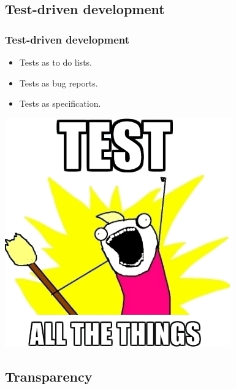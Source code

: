 \documentclass[12pt,compress,english,utf8,t]{beamer}
\begin{document}

\subsection{Test-driven development}

\begin{frame}\frametitle{Test-driven development}
  \begin{itemize}
    \item Tests as to do lists.
    \item Tests as bug reports.
    \item Tests as specification.
  \end{itemize}

  \begin{center}
    \includegraphics[scale=0.5]{images/test-all-the-things.jpeg}
  \end{center}
\end{frame}


\subsection{Transparency}
\end{document}
